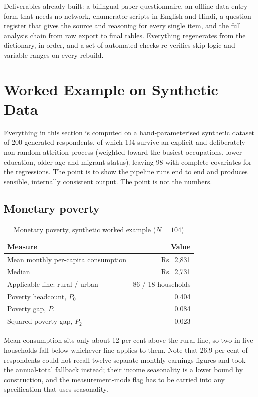 \documentclass[11pt]{article}
\begin{document}
Deliverables already built: a bilingual paper questionnaire, an offline data-entry form that
needs no network, enumerator scripts in English and Hindi, a question register that gives the
source and reasoning for every single item, and the full analysis chain from raw export to
final tables. Everything regenerates from the dictionary, in order, and a set of automated
checks re-verifies skip logic and variable ranges on every rebuild.

\section{Worked Example on Synthetic Data}\label{sec:worked}

Everything in this section is computed on a hand-parameterised synthetic dataset of 200
generated respondents, of which 104 survive an explicit and deliberately non-random attrition
process (weighted toward the busiest occupations, lower education, older age and migrant
status), leaving 98 with complete covariates for the regressions. The point is to show the
pipeline runs end to end and produces sensible, internally consistent output. The point is not
the numbers.

\subsection{Monetary poverty}

\begin{table}[h]
\centering
\caption{Monetary poverty, synthetic worked example ($N = 104$)}
\begin{tabular}{lr}
\toprule
Measure & Value \\
\midrule
Mean monthly per-capita consumption & Rs.\ 2,831 \\
Median & Rs.\ 2,731 \\
Applicable line: rural / urban & 86 / 18 households \\
Poverty headcount, $P_0$ & 0.404 \\
Poverty gap, $P_1$ & 0.084 \\
Squared poverty gap, $P_2$ & 0.023 \\
\bottomrule
\end{tabular}
\end{table}

Mean consumption sits only about 12 per cent above the rural line, so two in five households
fall below whichever line applies to them. Note that 26.9 per cent of respondents could not
recall twelve separate monthly earnings figures and took the annual-total fallback instead;
their income seasonality is a lower bound by construction, and the measurement-mode flag has to
be carried into any specification that uses seasonality.
\end{document}

